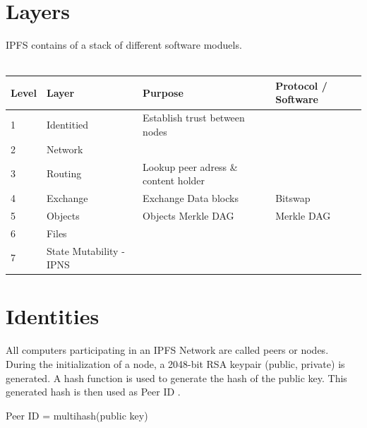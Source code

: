 \documentclass[a4paper,11pt, oneside]{report}
\theoremstyle{definition}
\begin{document}
\section{Layers}
IPFS contains of a stack of different software moduels.\\ \\
\noindent
\begin{tabularx}{\textwidth}{XXXX}
Level & Layer & Purpose & Protocol / Software\\ \hline
1 & Identitied & Establish trust between nodes &\\ \hline
2 & Network &  &\\ \hline
3 & Routing & Lookup peer adress \& content holder &  \\ \hline
4 & Exchange & Exchange Data blocks & Bitswap \\ \hline
5 & Objects & Objects Merkle DAG & Merkle DAG\\ \hline
6 & Files & &\\ \hline
7 & State Mutability - IPNS & &\\ \hline
\end{tabularx}


\newpage
\section{Identities}
All computers participating in an IPFS Network are called peers or nodes.\\
During the initialization of a node, a 2048-bit RSA keypair (public, private) is generated. A hash function is used to generate the hash of the public key. This generated hash is then used as Peer ID \cite{PeerID}.
\begin{center}
Peer ID = multihash(public key)
\end{center}
\end{document}
